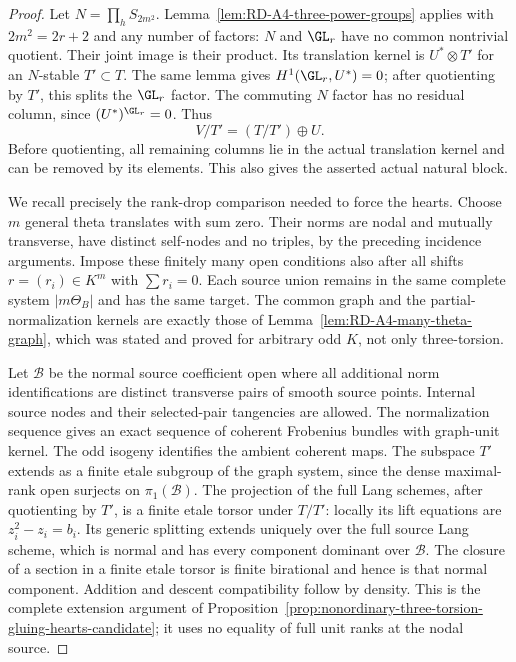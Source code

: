 \begin{proof}
Let $N=\prod_hS_{2m^2}$. Lemma~\ref{lem:RD-A4-three-power-groups}
applies with $2m^2=2r+2$ and any number of factors: $N$ and
$\GL_r$ have no common nontrivial quotient. Their joint image
is their product. Its translation kernel is $U^*\otimes T'$
for an $N$-stable $T'\subset T$. The same lemma gives
$H^1(\GL_r,U^*)=0$; after quotienting by $T'$, this splits the
$\GL_r$ factor. The commuting $N$ factor has no residual column,
since $(U^*)^{\GL_r}=0$. Thus
\[
                         V/T'=(T/T')\oplus U.
\]
Before quotienting, all remaining columns lie in the actual
translation kernel and can be removed by its elements. This also
gives the asserted actual natural block.

We recall precisely the rank-drop comparison needed to force
the hearts. Choose $m$ general theta translates with sum zero.
Their norms are nodal and mutually transverse, have distinct
self-nodes and no triples, by the preceding incidence arguments.
Impose these finitely many open conditions also after all shifts
$r=(r_i)\in K^m$ with $\sum r_i=0$. Each source union remains
in the same complete system $|m\Theta_B|$ and has the same target.
The common graph and the partial-normalization kernels are exactly
those of Lemma~\ref{lem:RD-A4-many-theta-graph}, which was stated
and proved for arbitrary odd $K$, not only three-torsion.

Let $\mathcal B$ be the normal source coefficient open where all
additional norm identifications are distinct transverse pairs of
smooth source points. Internal source nodes and their selected-pair
tangencies are allowed. The normalization sequence gives an exact
sequence of coherent Frobenius bundles with graph-unit kernel.
The odd isogeny identifies the ambient coherent maps. The subspace
$T'$ extends as a finite etale subgroup of the graph system, since
the dense maximal-rank open surjects on $\pi_1(\mathcal B)$.
The projection of the full Lang schemes, after quotienting by $T'$,
is a finite etale torsor under $T/T'$: locally its lift equations
are $z_i^2-z_i=b_i$. Its generic splitting extends uniquely over
the full source Lang scheme, which is normal and has every
component dominant over $\mathcal B$. The closure of a section
in a finite etale torsor is finite birational and hence is that
normal component. Addition and descent compatibility follow by
density. This is the complete extension argument of
Proposition~\ref{prop:nonordinary-three-torsion-gluing-hearts-candidate};
it uses no equality of full unit ranks at the nodal source.


\end{proof}
